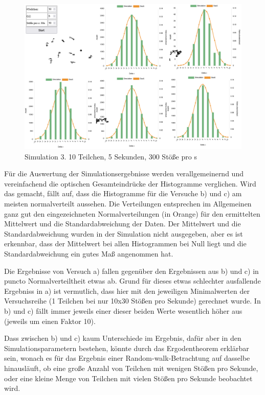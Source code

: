 \documentclass[
  9pt,
]{article}
\begin{document}
\begin{figure}
\centering
\includegraphics[width=\textwidth,height=0.25\textheight]{Daten/c.png}
\caption{Simulation 3. 10 Teilchen, 5 Sekunden, 300 Stöße pro s}
\end{figure}

Für die Auswertung der Simulationsergebnisse werden verallgemeinernd und
vereinfachend die optischen Gesamteindrücke der Histogramme verglichen.
Wird das gemacht, fällt auf, dass die Histogramme für die Versuche b)
und c) am meisten normalverteilt aussehen. Die Verteilungen entsprechen
im Allgemeinen ganz gut den eingezeichneten Normalverteilungen (in
Orange) für den ermittelten Mittelwert und die Standardabweichung der
Daten. Der Mittelwert und die Standardabweichung wurden in der
Simulation nicht ausgegeben, aber es ist erkennbar, dass der Mittelwert
bei allen Histogrammen bei Null liegt und die Standardabweichung ein
gutes Maß angenommen hat.

Die Ergebnisse von Versuch a) fallen gegenüber den Ergebnissen aus b)
und c) in puncto Normalverteiltheit etwas ab. Grund für dieses etwas
schlechter ausfallende Ergebniss in a) ist vermutlich, dass hier mit den
jeweiligen Minimalwerten der Versuchsreihe (1 Teilchen bei nur 10x30
Stößen pro Sekunde) gerechnet wurde. In b) und c) fällt immer jeweils
einer dieser beiden Werte wesentlich höher aus (jeweils um einen Faktor
10).

Dass zwischen b) und c) kaum Unterschiede im Ergebnis, dafür aber in den
Simulationsparametern bestehen, könnte durch das Ergodentheorem
erklärbar sein, wonach es für das Ergebnis einer Random-walk-Betrachtung
auf dasselbe hinausläuft, ob eine große Anzahl von Teilchen mit wenigen
Stößen pro Sekunde, oder eine kleine Menge von Teilchen mit vielen
Stößen pro Sekunde beobachtet wird.
\end{document}
